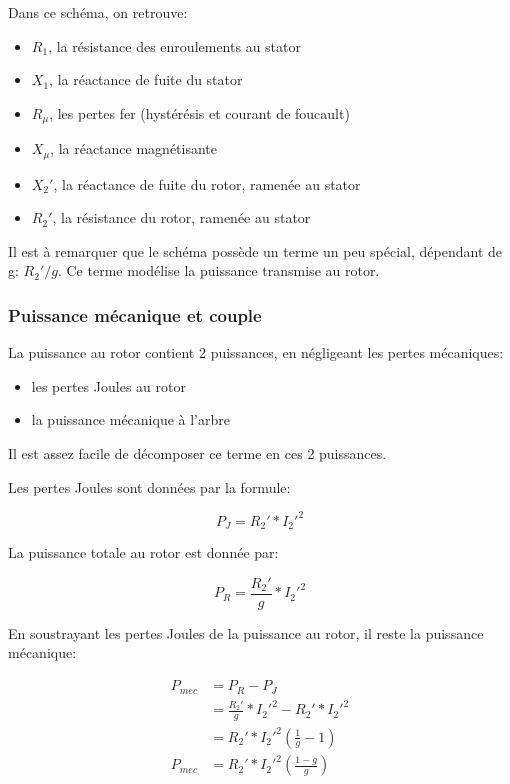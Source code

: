 \documentclass[11pt]{article}
\providecommand{\tightlist}{%
      \setlength{\itemsep}{0pt}\setlength{\parskip}{0pt}}
\begin{document}
    Dans ce schéma, on retrouve:

\begin{itemize}
\tightlist
\item
  \(R_1\), la résistance des enroulements au stator
\item
  \(X_1\), la réactance de fuite du stator
\item
  \(R_{\mu}\), les pertes fer (hystérésis et courant de foucault)
\item
  \(X_{\mu}\), la réactance magnétisante
\item
  \(X_2'\), la réactance de fuite du rotor, ramenée au stator
\item
  \(R_2'\), la résistance du rotor, ramenée au stator
\end{itemize}

    Il est à remarquer que le schéma possède un terme un peu spécial,
dépendant de g: \(R_2'/g\). Ce terme modélise la puissance transmise au
rotor.

    \hypertarget{puissance-muxe9canique-et-couple}{%
\subsubsection{Puissance mécanique et
couple}\label{puissance-muxe9canique-et-couple}}

    La puissance au rotor contient 2 puissances, en négligeant les pertes
mécaniques:

\begin{itemize}
\tightlist
\item
  les pertes Joules au rotor
\item
  la puissance mécanique à l'arbre
\end{itemize}

    Il est assez facile de décomposer ce terme en ces 2 puissances.

    Les pertes Joules sont données par la formule:

\[ P_J = R_2' * I_2'^2 \]

    La puissance totale au rotor est donnée par:

\[ P_R = \frac{R_2'}{g} * I_2'^2 \]

    En soustrayant les pertes Joules de la puissance au rotor, il reste la
puissance mécanique:

\begin{align}
  P_{mec} &= P_R - P_J \\
  &= \frac{R_2'}{g} * I_2'^2 - R_2' * I_2'^2 \\
  &= R_2' * I_2'^2 \left(\frac{1}{g} - 1\right) \\
  P_{mec} &= R_2' * I_2'^2 \left(\frac{1-g}{g}\right)
\end{align}
\end{document}
